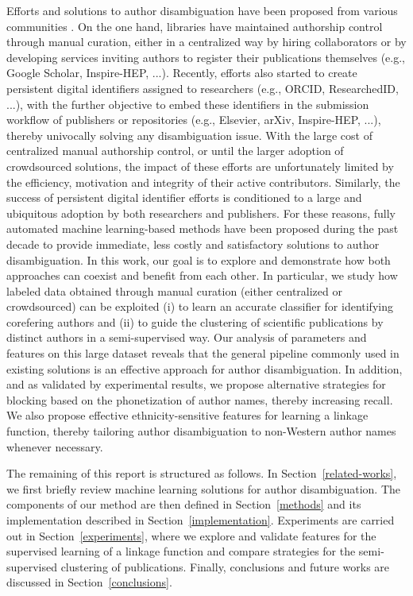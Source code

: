 \documentclass{article}
\begin{document}
Efforts and solutions to author disambiguation have been proposed from various
communities \citep{liu2014author}. On the one hand, libraries have maintained
authorship control through manual curation, either in a centralized way by
hiring collaborators or by developing services inviting authors to register
their publications themselves (e.g., Google Scholar, Inspire-HEP, ...).
Recently, efforts also started to create persistent digital identifiers
assigned to researchers (e.g., ORCID, ResearchedID, ...), with the further
objective to embed these identifiers in the submission workflow of publishers
or repositories (e.g., Elsevier, arXiv, Inspire-HEP, ...), thereby univocally
solving any disambiguation issue. With the large cost of centralized manual
authorship control, or until the larger adoption of crowdsourced solutions, the
impact of these efforts are unfortunately limited by the efficiency, motivation
and integrity of their active contributors. Similarly, the success of
persistent digital identifier efforts is conditioned to a large and ubiquitous
adoption by both researchers and publishers. For these reasons, fully automated
machine learning-based methods have been proposed during the past decade to
provide immediate, less costly and satisfactory solutions to author
disambiguation. In this work, our goal is to explore and demonstrate how both
approaches can coexist and benefit from each other.  In particular, we study
how labeled data obtained through manual curation (either centralized or
crowdsourced) can be exploited (i) to learn an accurate classifier for
identifying corefering authors and (ii) to guide the clustering of scientific
publications by distinct authors in a semi-supervised way. Our analysis of parameters
and features on this large dataset reveals that the general pipeline
commonly used in existing solutions is an effective approach for author disambiguation.
In addition, and  as validated
by experimental results, we propose alternative strategies for blocking based on the
phonetization of author names, thereby increasing recall. We also propose
effective ethnicity-sensitive features for learning a linkage function,
thereby tailoring author
disambiguation to non-Western author names whenever necessary.

The remaining of this report is structured as follows. In Section~\ref{related-works},
we first briefly review machine learning solutions for author disambiguation.
The components of our method are then defined in Section~\ref{methods}
and its implementation described in Section~\ref{implementation}. Experiments
are carried out in Section~\ref{experiments}, where we explore and validate
features for the supervised learning of a linkage function and compare
strategies for the semi-supervised clustering of publications.
Finally, conclusions and future works are discussed in Section~\ref{conclusions}.
\end{document}
